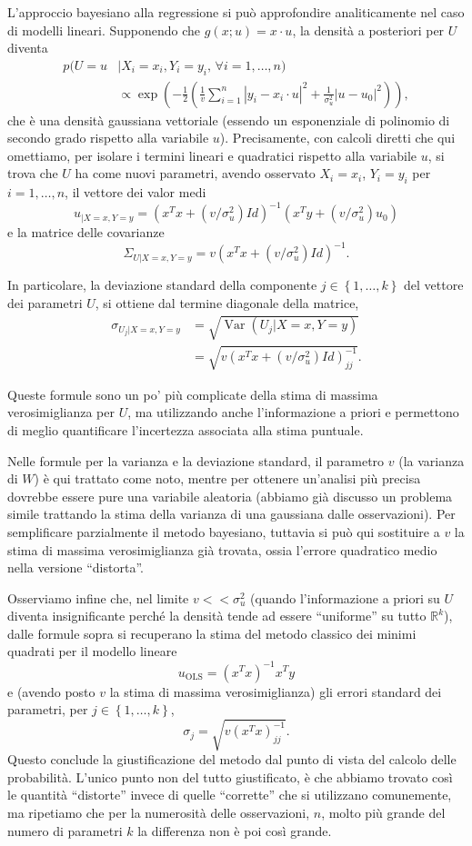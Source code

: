 \documentclass[
  italian,
  letterpaper,
]{book}
\newcommand{\bra}[1]{\left( #1 \right)}
\newcommand{\cur}[1]{\left\{ #1 \right\}}
\newcommand{\R}{\mathbb{R}}
\newcommand{\Var}[1]{\operatorname{Var}\bra{#1}}
\newcommand{\ols}{\operatorname{OLS}}
\theoremstyle{definition}
\theoremstyle{remark}
\begin{document}
L'approccio bayesiano alla regressione si può approfondire
analiticamente nel caso di modelli lineari. Supponendo che
\(g(x;u) = x\cdot u\), la densità a posteriori per \(U\) diventa
\[  \begin{split} p(U = u & | X_i=x_i, Y_i= y_i, \,  \forall i=1, \ldots, n)  \\
& \propto \exp\bra{ -\frac 1 {2} \bra{ \frac 1 v \sum_{i=1}^n |y_i- x_i \cdot u|^2 +\frac 1 {\sigma_u^2} |u-u_0|^2}},\end{split}\]
che è una densità gaussiana vettoriale (essendo un esponenziale di
polinomio di secondo grado rispetto alla variabile \(u\)). Precisamente,
con calcoli diretti che qui omettiamo, per isolare i termini lineari e
quadratici rispetto alla variabile \(u\), si trova che \(U\) ha come
nuovi parametri, avendo osservato \(X_i=x_i\), \(Y_i=y_i\) per
\(i=1,\ldots, n\), il vettore dei valor medi
\[ u_{|X=x,Y=y} = \bra{ x^T x + (v/\sigma_u^2)Id}^{-1} \bra{ x^T y + (v/\sigma_u^2) u_0}\]
e la matrice delle covarianze
\[ \Sigma_{U|X=x,Y=y} =  v \bra{ x^T x + (v/\sigma_u^2)Id}^{-1}.\]

In particolare, la deviazione standard della componente
\(j \in \cur{1, \ldots, k}\) del vettore dei parametri \(U\), si ottiene
dal termine diagonale della matrice,
\[\begin{split}  \sigma_{U_j|X=x, Y=y} & = \sqrt{ \Var{U_j| X=x, Y=y}} 
\\ & = \sqrt{v \bra{x^T x +(v/\sigma_u^2) Id}^{-1}_{jj}}.\end{split}\]

Queste formule sono un po' più complicate della stima di massima
verosimiglianza per \(U\), ma utilizzando anche l'informazione a priori
e permettono di meglio quantificare l'incertezza associata alla stima
puntuale.

Nelle formule per la varianza e la deviazione standard, il parametro
\(v\) (la varianza di \(W\)) è qui trattato come noto, mentre per
ottenere un'analisi più precisa dovrebbe essere pure una variabile
aleatoria (abbiamo già discusso un problema simile trattando la stima
della varianza di una gaussiana dalle osservazioni). Per semplificare
parzialmente il metodo bayesiano, tuttavia si può qui sostituire a \(v\)
la stima di massima verosimiglianza già trovata, ossia l'errore
quadratico medio nella versione ``distorta''.

Osserviamo infine che, nel limite \(v<<\sigma_u^2\) (quando
l'informazione a priori su \(U\) diventa insignificante perché la
densità tende ad essere ``uniforme'' su tutto \(\R^k\)), dalle formule
sopra si recuperano la stima del metodo classico dei minimi quadrati per
il modello lineare \[ u_{\ols} = (x^Tx )^{-1} x^T y\] e (avendo posto
\(v\) la stima di massima verosimiglianza) gli errori standard dei
parametri, per \(j \in \cur{1, \ldots, k}\),
\[ \sigma_j = \sqrt{v \bra{x^T x}^{-1}_{jj}}.\] Questo conclude la
giustificazione del metodo dal punto di vista del calcolo delle
probabilità. L'unico punto non del tutto giustificato, è che abbiamo
trovato così le quantità ``distorte'' invece di quelle ``corrette'' che
si utilizzano comunemente, ma ripetiamo che per la numerosità delle
osservazioni, \(n\), molto più grande del numero di parametri \(k\) la
differenza non è poi così grande.
\end{document}
